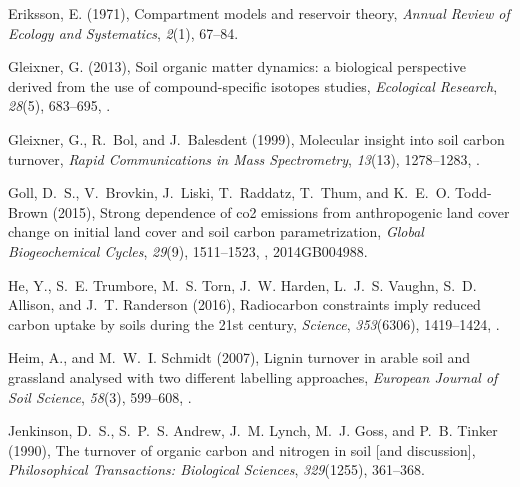 \documentclass[draft,linenumbers]{agujournal}
\begin{document}
\begin{thebibliography}{41}
Eriksson, E. (1971), Compartment models and reservoir theory, \textit{Annual
  Review of Ecology and Systematics}, \textit{2}(1), 67--84.

Gleixner, G. (2013), Soil organic matter dynamics: a biological perspective
  derived from the use of compound-specific isotopes studies,
  \textit{Ecological Research}, \textit{28}(5), 683--695,
  .

Gleixner, G., R.~Bol, and J.~Balesdent (1999), Molecular insight into soil
  carbon turnover, \textit{Rapid Communications in Mass Spectrometry},
  \textit{13}(13), 1278--1283,
  .

Goll, D.~S., V.~Brovkin, J.~Liski, T.~Raddatz, T.~Thum, and K.~E.~O. Todd-Brown
  (2015), Strong dependence of co2 emissions from anthropogenic land cover
  change on initial land cover and soil carbon parametrization, \textit{Global
  Biogeochemical Cycles}, \textit{29}(9), 1511--1523,
  , 2014GB004988.

He, Y., S.~E. Trumbore, M.~S. Torn, J.~W. Harden, L.~J.~S. Vaughn, S.~D.
  Allison, and J.~T. Randerson (2016), Radiocarbon constraints imply reduced
  carbon uptake by soils during the 21st century, \textit{Science},
  \textit{353}(6306), 1419--1424, .

Heim, A., and M.~W.~I. Schmidt (2007), Lignin turnover in arable soil and
  grassland analysed with two different labelling approaches, \textit{European
  Journal of Soil Science}, \textit{58}(3), 599--608,
  .

Jenkinson, D.~S., S.~P.~S. Andrew, J.~M. Lynch, M.~J. Goss, and P.~B. Tinker
  (1990), The turnover of organic carbon and nitrogen in soil [and discussion],
  \textit{Philosophical Transactions: Biological Sciences}, \textit{329}(1255),
  361--368.


\end{thebibliography}
\end{document}
